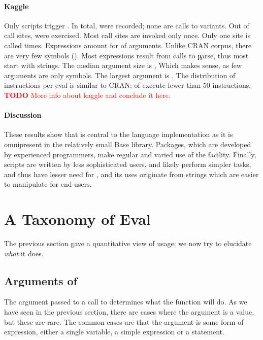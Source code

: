 \documentclass[screen,acmsmall]{acmart}
\newcommand{\authorcomment}[3]{\xspace\textcolor{#1}{{\bf #2} #3}\xspace}
\newcommand{\todo}[1]{\authorcomment{red}{TODO}{#1}}
\begin{document}
\paragraph{Kaggle}
Only \kaggleNbruns scripts trigger \eval. In total, \kaggleAllcalls \eval were
recorded; none are calls to variants. Out of \kaggleStaticeval call sites,
\kaggleTriggeredeval were exercised. Most call sites are invoked only once. Only
one site is called \kaggleMaxcalls times. Expressions amount for
\kaggleCodepercent of arguments. Unlike CRAN corpus, there are very few symbols
(\kaggleSymbolpercent). Most expressions result from calls to \c{parse}, thus
most \evals start with strings. The median argument size is \kaggleMedianszeval,
Which makes sense, as few arguments are only symbols. The largest argument is
\kaggleMaxszeval. The distribution of instructions per eval is similar to CRAN;
\kaggleSmalleventspct of \evals execute fewer than 50 instructions.
\todo{More info about kaggle and conclude it here.}

\paragraph{Discussion}
These results show that \eval is central to the language implementation as it is
omnipresent in the relatively small Base library. Packages, which are developed
by experienced programmers, make regular and varied use of the facility.
Finally, scripts are written by less sophisticated users, and likely perform
simpler tasks, and thus have lesser need for \eval, and its uses originate from
strings which are easier to manipulate for end-users.

\newpage
\section{A Taxonomy of Eval}

The previous section gave a quantitative view of \eval usage; we now try to
elucidate \emph{what} it does.

\subsection{Arguments of \eval}

The argument passed to a call to \eval determines what the function will do. As
we have seen in the previous section, there are cases where the argument is a
value, but these are rare. The common cases are that the argument is some form
of expression, either a single variable, a simple expression or a statement.
\end{document}
